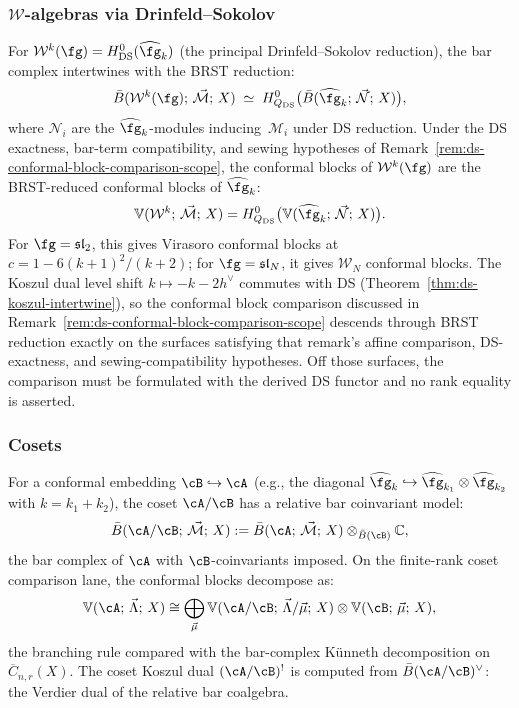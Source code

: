 \subsubsection{$\mathcal{W}$-algebras via Drinfeld--Sokolov}

For $\mathcal{W}^k(\fg) = H^0_{\mathrm{DS}}(\widehat{\fg}_k)$
(the principal Drinfeld--Sokolov reduction), the bar complex
intertwines with the BRST reduction:
\begin{equation}\label{eq:ds-bar-intertwining}
\bar{B}(\mathcal{W}^k(\fg);\, \vec{\mathcal{M}};\, X)
\;\simeq\;
H^0_{Q_{\mathrm{DS}}}\bigl(
\bar{B}(\widehat{\fg}_k;\, \vec{\mathcal{N}};\, X)\bigr),
\end{equation}
where $\mathcal{N}_i$ are the $\widehat{\fg}_k$-modules
inducing~$\mathcal{M}_i$ under DS reduction.
Under the DS exactness, bar-term compatibility, and sewing hypotheses
of Remark~\ref{rem:ds-conformal-block-comparison-scope}, the
conformal blocks of $\mathcal{W}^k(\fg)$ are the BRST-reduced
conformal blocks of $\widehat{\fg}_k$:
\[
\mathbb{V}(\mathcal{W}^k;\, \vec{\mathcal{M}};\, X)
= H^0_{Q_{\mathrm{DS}}}\bigl(
\mathbb{V}(\widehat{\fg}_k;\, \vec{\mathcal{N}};\, X)\bigr).
\]
For $\fg = \mathfrak{sl}_2$, this gives Virasoro conformal blocks
at $c = 1 - 6(k+1)^2/(k+2)$; for $\fg = \mathfrak{sl}_N$, it
gives $\mathcal{W}_N$ conformal blocks. The Koszul dual level
shift $k \mapsto -k - 2h^\vee$ commutes with DS
(Theorem~\ref{thm:ds-koszul-intertwine}), so the conformal block
comparison discussed in
Remark~\ref{rem:ds-conformal-block-comparison-scope} descends through
BRST reduction exactly on the surfaces satisfying that remark's
affine comparison, DS-exactness, and sewing-compatibility hypotheses.
Off those surfaces, the comparison must be formulated with the derived
DS functor and no rank equality is asserted.

\subsubsection{Cosets}

For a conformal embedding $\cB \hookrightarrow \cA$ (e.g.,
the diagonal $\widehat{\fg}_k \hookrightarrow
\widehat{\fg}_{k_1} \otimes \widehat{\fg}_{k_2}$ with
$k = k_1 + k_2$), the coset $\cA / \cB$ has a relative bar
coinvariant model:
\[
\bar{B}(\cA/\cB;\, \vec{\mathcal{M}};\, X)
:= \bar{B}(\cA;\, \vec{\mathcal{M}};\, X)
\otimes_{\bar{B}(\cB)} \mathbb{C},
\]
the bar complex of $\cA$ with $\cB$-coinvariants imposed. On the
finite-rank coset comparison lane, the conformal blocks decompose as:
\[
\mathbb{V}(\cA;\, \vec{\Lambda};\, X)
\cong \bigoplus_{\vec{\mu}}
\mathbb{V}(\cA/\cB;\, \vec{\Lambda}/\vec{\mu};\, X)
\otimes \mathbb{V}(\cB;\, \vec{\mu};\, X),
\]
the branching rule compared with the bar-complex Künneth decomposition
on $\overline{C}_{n,r}(X)$. The coset
Koszul dual $(\cA/\cB)^!$ is computed from
$\bar{B}(\cA/\cB)^\vee$: the Verdier dual of the relative bar
coalgebra.

